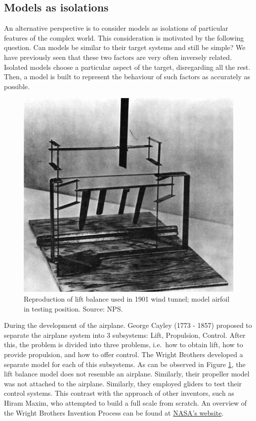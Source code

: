 \documentclass[
]{book}
\begin{document}
\hypertarget{models-as-isolations}{%
\subsection{Models as isolations}\label{models-as-isolations}}

An alternative perspective is to consider models as isolations of particular features of the complex world. This consideration is motivated by the following question. Can models be similar to their target systems and still be simple? We have previously seen that these two factors are very often inversely related. Isolated models choose a particular aspect of the target, disregarding all the rest. Then, a model is built to represent the behaviour of such factors as accurately as possible.

\begin{figure}

{\centering \includegraphics[width=0.5\linewidth]{Figures/lift} 

}

\caption{Reproduction of lift balance used in 1901 wind tunnel; model airfoil in testing position. Source: NPS.}\label{fig:lift}
\end{figure}

During the development of the airplane. George Cayley (1773 - 1857) proposed to separate the airplane system into 3 subsystems: Lift, Propulsion, Control. After this, the problem is divided into three problems, i.e.~how to obtain lift, how to provide propulsion, and how to offer control. The Wright Brothers developed a separate model for each of this subsystems. As can be observed in Figure \ref{fig:lift}, the lift balance model does not resemble an airplane. Similarly, their propeller model was not attached to the airplane. Similarly, they employed gliders to test their control systems. This contrast with the approach of other inventors, such as Hiram Maxim, who attempted to build a full scale from scratch.
An overview of the Wright Brothers Invention Process can be found at \href{https://wright.nasa.gov/overview.htm}{NASA's website}.
\end{document}
